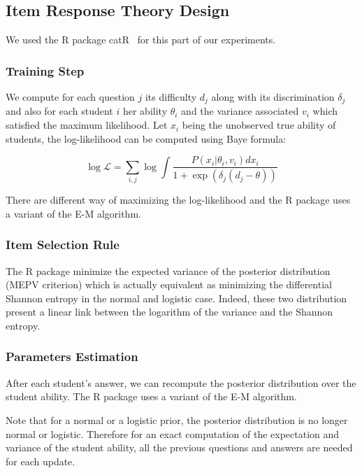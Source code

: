 \documentclass{sig-alternate}
\begin{document}
\subsection{Item Response Theory Design}

We used the R package catR~\cite{MagisRaiche12} for this part of our experiments.

\subsubsection{Training Step}

We compute for each question $j$ its difficulty $d_j$ along with its discrimination $\delta_j$ and also for each student $i$ her ability $\theta_i$ and the variance associated $v_i$ which satisfied the maximum likelihood. Let $x_i$ being the unobserved true ability of students, the log-likelihood can be computed using Baye formula: 

\[\log \mathcal{L} = \sum_{i,j} \log \int \frac{P(x_i | \theta_i, v_i)dx_i}{1+\exp(\delta_j (d_j - \theta))}\]

There are different way of maximizing the log-likelihood and the R package uses a variant of the E-M algorithm. 

\subsubsection{Item Selection Rule}

The R package minimize the expected variance of the posterior distribution (MEPV criterion) which is actually equivalent as minimizing the differential Shannon entropy in the normal and logistic case. Indeed, these two distribution present a linear link between the logarithm of the variance and the Shannon entropy. 

\subsubsection{Parameters Estimation}

After each student's answer, we can recompute the posterior distribution over the student ability. The R package uses a variant of the E-M algorithm. 

Note that for a normal or a logistic prior, the posterior distribution is no longer normal or logistic. Therefore for an exact computation of the expectation and variance of the student ability, all the previous questions and answers are needed for each update. 
\end{document}
